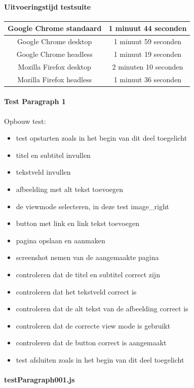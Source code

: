 \paragraph{Uitvoeringstijd testsuite}
\begin{tabular}{ |c| c| }
\hline
	Google Chrome standaard & 1 minuut 44 seconden \\
\hline
	Google Chrome desktop & 1 minuut 59 seconden \\
\hline
 	Google Chrome headless & 1 minuut 19 seconden \\
\hline
 	Mozilla Firefox desktop & 2 minuten 10 seconden \\
\hline
 	Mozilla Firefox headless & 1 minuut 36 seconden \\
\hline
\end{tabular}


\clearpage
\paragraph{Test Paragraph 1}
\label{test1}
Opbouw test: 
\begin{itemize}
\item test opstarten zoals in het begin van dit deel toegelicht
\item titel en subtitel invullen
\item tekstveld invullen
\item afbeelding met alt tekst toevoegen
\item de viewmode selecteren, in deze test image\_right
\item button met link en link tekst toevoegen
\item pagina opslaan en aanmaken
\item screenshot nemen van de aangemaakte pagina
\item controleren dat de titel en subtitel correct zijn
\item controleren dat het tekstveld correct is
\item controleren dat de alt tekst van de afbeelding correct is
\item controleren dat de correcte view mode is gebruikt
\item controleren dat de button correct is aangemaakt
\item test afsluiten zoals in het begin van dit deel toegelicht
\end{itemize}
\paragraph{testParagraph001.js}



